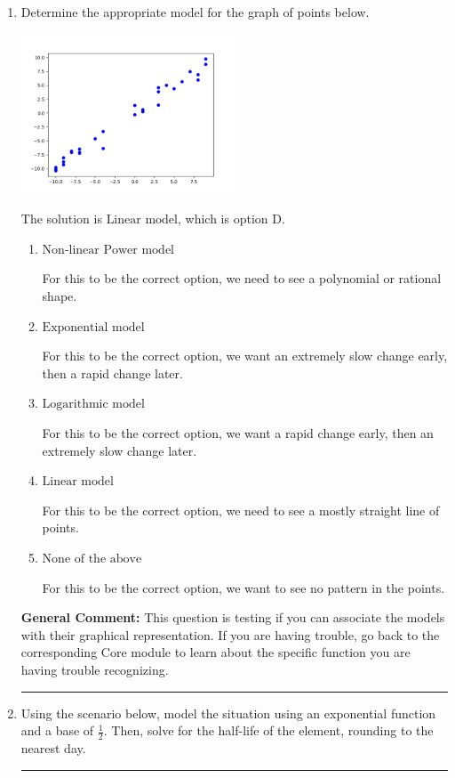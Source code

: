 \documentclass{extbook}[14pt]
\newcommand{\litem}[1]{\item #1

\rule{\textwidth}{0.4pt}}
\begin{document}
\begin{enumerate}\litem{
Determine the appropriate model for the graph of points below.

\begin{center}
    \includegraphics[width=0.5\textwidth]{../Figures/identifyModelGraph11B.png}
\end{center}


The solution is \( \text{Linear model} \), which is option D.\begin{enumerate}[label=\Alph*.]
\item \( \text{Non-linear Power model} \)

For this to be the correct option, we need to see a polynomial or rational shape.
\item \( \text{Exponential model} \)

For this to be the correct option, we want an extremely slow change early, then a rapid change later.
\item \( \text{Logarithmic model} \)

For this to be the correct option, we want a rapid change early, then an extremely slow change later.
\item \( \text{Linear model} \)

For this to be the correct option, we need to see a mostly straight line of points.
\item \( \text{None of the above} \)

For this to be the correct option, we want to see no pattern in the points.
\end{enumerate}

\textbf{General Comment:} This question is testing if you can associate the models with their graphical representation. If you are having trouble, go back to the corresponding Core module to learn about the specific function you are having trouble recognizing.
}
\litem{
Using the scenario below, model the situation using an exponential function and a base of $\frac{1}{2}$. Then, solve for the half-life of the element, rounding to the nearest day.

}
\end{enumerate}
\end{document}
